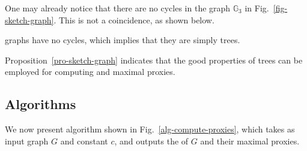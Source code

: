 One may already notice that there are no cycles in the \bcsketch graph $\mathbb{G}_3$ in Fig.~\ref{fig-sketch-graph}. This is not a coincidence, as shown below.

\begin{prop}
\label{pro-sketch-graph} \bcsketch graphs have no cycles, which implies that they are simply trees.
\end{prop}



Proposition~\ref{pro-sketch-graph} indicates that the good properties of trees can be employed for computing \dras and maximal proxies.


\subsection{Algorithms}
\label{subsec-alg}
We now present algorithm \compDRAs shown in Fig.~\ref{alg-compute-proxies}, which takes as input graph $G$ and constant $c$, and outputs the \dras of $G$ and their maximal proxies.


